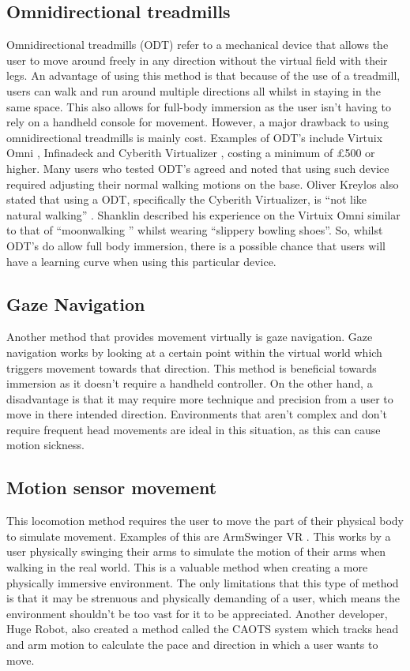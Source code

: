 \documentclass[12pt]{report}
\begin{document}
\subsection{Omnidirectional treadmills}
Omnidirectional treadmills (ODT) refer to a mechanical device that allows the user to move around freely in any direction without the virtual field with their legs. An advantage of using this method is that because of the use of a treadmill, users can walk and run around multiple directions all whilst in staying in the same space. This also allows for full-body immersion as the user isn’t having to rely on a handheld console for movement. However, a major drawback to using omnidirectional treadmills is mainly cost. Examples of ODT’s include Virtuix Omni , Infinadeck  and Cyberith Virtualizer , costing a minimum of £500 or higher. Many users who tested ODT’s agreed and noted that using such device required adjusting their normal walking motions on the base. Oliver Kreylos also stated that using a ODT, specifically the Cyberith Virtualizer, is “not like natural walking”  . Shanklin described his experience on the Virtuix Omni similar to that of “moonwalking ” whilst wearing “slippery bowling shoes”. So, whilst ODT’s do allow full body immersion, there is a possible chance that users will have a learning curve when using this particular device.   

\subsection{Gaze Navigation}
Another method that provides movement virtually is gaze navigation. Gaze navigation works by looking at a certain point within the virtual world which triggers movement towards that direction. This method is beneficial towards immersion as it doesn’t require a handheld controller. On the other hand, a disadvantage is that it may require more technique and precision from a user to move in there intended direction.  Environments that aren’t complex and don’t require frequent head movements are ideal in this situation, as this can cause motion sickness.  

\subsection{Motion sensor movement}
This locomotion method requires the user to move the part of their physical body to simulate movement. Examples of this are ArmSwinger VR  . This works by a user physically swinging their arms to simulate the motion of their arms when walking in the real world. This is a valuable method when creating a more physically immersive environment. The only limitations that this type of method is that it may be strenuous and physically demanding of a user, which means the environment shouldn’t be too vast for it to be appreciated. Another developer, Huge Robot, also created a method called the CAOTS system  which tracks head and arm motion to calculate the pace and direction in which a user wants to move.
\end{document}
